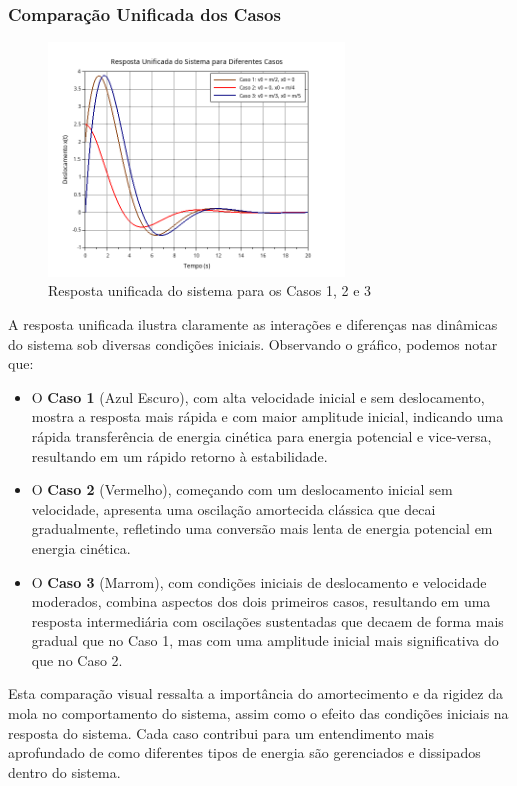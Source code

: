 \subsubsection{Comparação Unificada dos Casos}
\begin{figure}[H]
    \centering
    \includegraphics[width=0.7\textwidth]{1-atividade/assets/caso-all-in-one.png}
    \caption{Resposta unificada do sistema para os Casos 1, 2 e 3}
\end{figure}
A resposta unificada ilustra claramente as interações e diferenças nas dinâmicas do sistema sob diversas condições iniciais. Observando o gráfico, podemos notar que:
\begin{itemize}
    \item O \textbf{Caso 1} (Azul Escuro), com alta velocidade inicial e sem deslocamento, mostra a resposta mais rápida e com maior amplitude inicial, indicando uma rápida transferência de energia cinética para energia potencial e vice-versa, resultando em um rápido retorno à estabilidade.
    \item O \textbf{Caso 2} (Vermelho), começando com um deslocamento inicial sem velocidade, apresenta uma oscilação amortecida clássica que decai gradualmente, refletindo uma conversão mais lenta de energia potencial em energia cinética.
    \item O \textbf{Caso 3} (Marrom), com condições iniciais de deslocamento e velocidade moderados, combina aspectos dos dois primeiros casos, resultando em uma resposta intermediária com oscilações sustentadas que decaem de forma mais gradual que no Caso 1, mas com uma amplitude inicial mais significativa do que no Caso 2.
\end{itemize}
Esta comparação visual ressalta a importância do amortecimento e da rigidez da mola no comportamento do sistema, assim como o efeito das condições iniciais na resposta do sistema. Cada caso contribui para um entendimento mais aprofundado de como diferentes tipos de energia são gerenciados e dissipados dentro do sistema.



